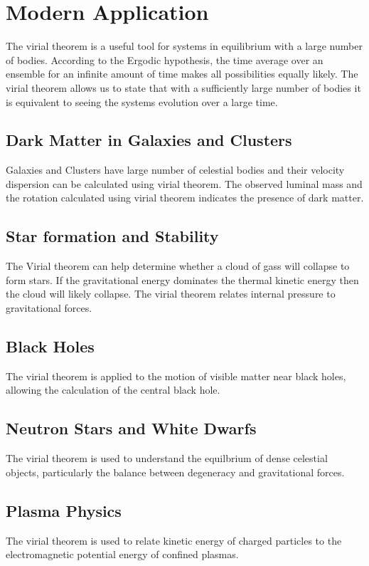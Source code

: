 \documentclass[12pt]{article}
\begin{document}
    \section{Modern Application}    
        The virial theorem is a useful tool for systems in equilibrium with a large number of bodies. According to the Ergodic hypothesis, the time average over an ensemble for an infinite amount of time makes all possibilities equally likely. The virial theorem allows us to state that with a sufficiently large number of bodies it is equivalent to seeing the systems evolution over a large time.
        \subsection{Dark Matter in Galaxies and Clusters}
        Galaxies and Clusters have large number of celestial bodies and their velocity dispersion can be calculated using virial theorem. The observed luminal mass and the rotation calculated using virial theorem indicates the presence of dark matter. 
        \subsection{Star formation and Stability}
        The Virial theorem can help determine whether a cloud of gass will collapse to form stars. If the gravitational energy dominates the thermal kinetic energy then the cloud will likely collapse. The virial theorem relates internal pressure to gravitational forces.
        \subsection{Black Holes}
        The virial theorem is applied to the motion of visible matter near black holes, allowing the calculation of the central black hole. 
        \subsection{Neutron Stars and White Dwarfs}
        The virial theorem is used to understand the equilbrium of dense celestial objects, particularly the balance between degeneracy and gravitational forces.
        \subsection{Plasma Physics}
        The virial theorem is used to relate kinetic energy of charged particles to the electromagnetic potential energy of confined plasmas.







    
\newpage
\printbibliography
\end{document}
